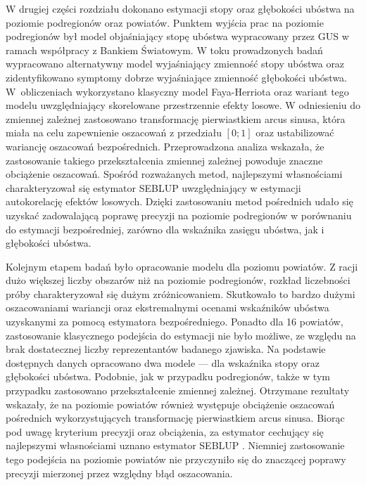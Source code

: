 W drugiej części rozdziału dokonano estymacji stopy oraz głębokości ubóstwa na poziomie podregionów oraz powiatów. Punktem wyjścia prac na poziomie podregionów był model objaśniający stopę ubóstwa wypracowany przez GUS w ramach współpracy z Bankiem Światowym. W toku prowadzonych badań wypracowano alternatywny model wyjaśniający zmienność stopy ubóstwa oraz zidentyfikowano symptomy dobrze wyjaśniające zmienność głębokości ubóstwa. W~obliczeniach wykorzystano klasyczny model Faya-Herriota oraz wariant tego modelu uwzględniający skorelowane przestrzennie efekty losowe. W odniesieniu do zmiennej zależnej zastosowano transformację pierwiastkiem arcus sinusa, która miała na celu zapewnienie oszacowań z przedziału $[0;1]$ oraz ustabilizować wariancję oszacowań bezpośrednich. Przeprowadzona analiza wskazała, że zastosowanie takiego przekształcenia zmiennej zależnej powoduje znaczne obciążenie oszacowań. Spośród rozważanych metod, najlepszymi własnościami charakteryzował się estymator SEBLUP uwzględniający w estymacji autokorelację efektów losowych. Dzięki zastosowaniu metod pośrednich udało się uzyskać zadowalającą poprawę precyzji na poziomie podregionów w porównaniu do estymacji bezpośredniej, zarówno dla wskaźnika zasięgu ubóstwa, jak i głębokości ubóstwa.

Kolejnym etapem badań było opracowanie modelu dla poziomu powiatów. Z racji dużo większej liczby obszarów niż na poziomie podregionów, rozkład liczebności próby charakteryzował się dużym zróżnicowaniem. Skutkowało to bardzo dużymi oszacowaniami wariancji oraz ekstremalnymi ocenami wskaźników ubóstwa uzyskanymi za pomocą estymatora bezpośredniego. Ponadto dla 16 powiatów, zastosowanie klasycznego podejścia do estymacji nie było możliwe, ze względu na brak dostatecznej liczby reprezentantów badanego zjawiska. Na podstawie dostępnych danych opracowano dwa modele --- dla wskaźnika stopy oraz głębokości ubóstwa. Podobnie, jak w przypadku podregionów, także w tym przypadku zastosowano przekształcenie zmiennej zależnej. Otrzymane rezultaty wskazały, że na poziomie powiatów również występuje obciążenie oszacowań pośrednich wykorzystujących transformację pierwiastkiem arcus sinusa. Biorąc pod uwagę kryterium precyzji oraz obciążenia, za estymator cechujący się najlepszymi własnościami uznano estymator SEBLUP \citep{wawrowski2016}. Niemniej zastosowanie tego podejścia na poziomie powiatów nie przyczyniło się do znaczącej poprawy precyzji mierzonej przez względny błąd oszacowania. 

